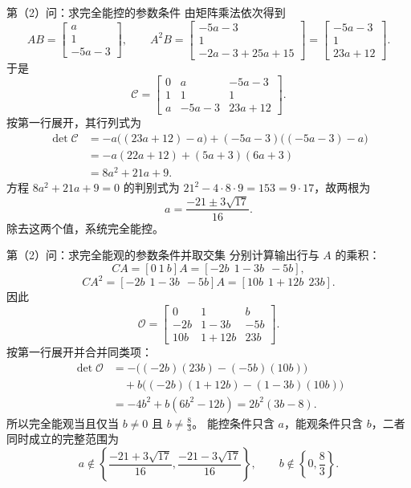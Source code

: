 \documentclass[11pt]{article}
\begin{document}
\begin{solution}
\begin{proofstep}{第（2）问：求完全能控的参数条件}
由矩阵乘法依次得到
\[
AB=\begin{bmatrix}a\\1\\-5a-3\end{bmatrix},\qquad
A^2B=\begin{bmatrix}-5a-3\\1\\-2a-3+25a+15\end{bmatrix}
=\begin{bmatrix}-5a-3\\1\\23a+12\end{bmatrix}.
\]
于是
\[
\mathcal C=\begin{bmatrix}
0&a&-5a-3\\
1&1&1\\
a&-5a-3&23a+12
\end{bmatrix}.
\]
按第一行展开，其行列式为
\begin{align*}
\det\mathcal C
&=-a\bigl((23a+12)-a\bigr)
  +(-5a-3)\bigl((-5a-3)-a\bigr)\\
&=-a(22a+12)+(5a+3)(6a+3)\\
&=8a^2+21a+9.
\end{align*}
方程 $8a^2+21a+9=0$ 的判别式为
$21^2-4\cdot8\cdot9=153=9\cdot17$，故两根为
\[
a=\frac{-21\pm3\sqrt{17}}{16}.
\]
除去这两个值，系统完全能控。
\end{proofstep}

\begin{proofstep}{第（2）问：求完全能观的参数条件并取交集}
分别计算输出行与 $A$ 的乘积：
\[
CA=[0\ 1\ b]A=[-2b\ \ 1-3b\ \ -5b],
\]
\[
CA^2=[-2b\ \ 1-3b\ \ -5b]A
=[10b\ \ 1+12b\ \ 23b].
\]
因此
\[
\mathcal O=\begin{bmatrix}
0&1&b\\
-2b&1-3b&-5b\\
10b&1+12b&23b
\end{bmatrix}.
\]
按第一行展开并合并同类项：
\begin{align*}
\det\mathcal O
&=-\bigl((-2b)(23b)-(-5b)(10b)\bigr)\\
&\quad+b\bigl((-2b)(1+12b)-(1-3b)(10b)\bigr)\\
&=-4b^2+b(6b^2-12b)=2b^2(3b-8).
\end{align*}
所以完全能观当且仅当 $b\ne0$ 且 $b\ne\tfrac83$。
能控条件只含 $a$，能观条件只含 $b$，二者同时成立的完整范围为
\[
\boxed{a\notin\left\{\frac{-21+3\sqrt{17}}{16},\frac{-21-3\sqrt{17}}{16}\right\},
\qquad b\notin\left\{0,\frac83\right\}.}
\]
\end{proofstep}
\end{solution}
\end{document}
